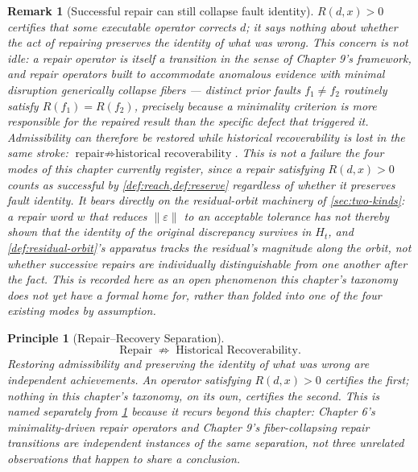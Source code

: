 \documentclass[12pt]{report}
\newtheorem{remark}[definition]{Remark}
\newtheorem{principle}[definition]{Principle}
\begin{document}
\begin{remark}[Successful repair can still collapse fault identity]
\label{rem:repair-fiber-collapse}
$R(d,x) > 0$ certifies that some executable operator corrects $d$; it
says nothing about whether the act of repairing preserves the identity
of what was wrong. This concern is not idle: a repair operator is
itself a transition in the sense of Chapter 9's framework, and
repair operators built to accommodate anomalous evidence with minimal
disruption generically collapse fibers --- distinct prior faults
$f_1 \neq f_2$ routinely satisfy $R(f_1) = R(f_2)$, precisely because a
minimality criterion is more responsible for the repaired result than
the specific defect that triggered it. Admissibility can therefore be
restored while historical recoverability is lost in the same stroke:
$\text{repair} \not\Rightarrow \text{historical recoverability}$. This
is not a failure the four modes of this chapter currently register,
since a repair satisfying $R(d,x) > 0$ counts as successful by
\cref{def:reach,def:reserve} regardless of whether it preserves fault
identity. It bears directly on the residual-orbit machinery of
\cref{sec:two-kinds}: a repair word $w$ that reduces $\|\varepsilon\|$
to an acceptable tolerance has not thereby shown that the identity of
the original discrepancy survives in $H_t$, and \cref{def:residual-orbit}'s
apparatus tracks the residual's magnitude along the orbit, not whether
successive repairs are individually distinguishable from one another
after the fact. This is recorded here as an open phenomenon this
chapter's taxonomy does not yet have a formal home for, rather than
folded into one of the four existing modes by assumption.
\end{remark}

\begin{principle}[Repair--Recovery Separation]
\label{princ:repair-recovery-separation}
\[
\text{Repair} \;\not\Rightarrow\; \text{Historical Recoverability}.
\]
Restoring admissibility and preserving the identity of what was wrong
are independent achievements. An operator satisfying $R(d,x) > 0$
certifies the first; nothing in this chapter's taxonomy, on its own,
certifies the second. This is named separately from
\cref{rem:repair-fiber-collapse} because it recurs beyond this
chapter: Chapter 6's minimality-driven repair operators and Chapter 9's
fiber-collapsing repair transitions are independent instances of the
same separation, not three unrelated observations that happen to share
a conclusion.
\end{principle}
\end{document}
